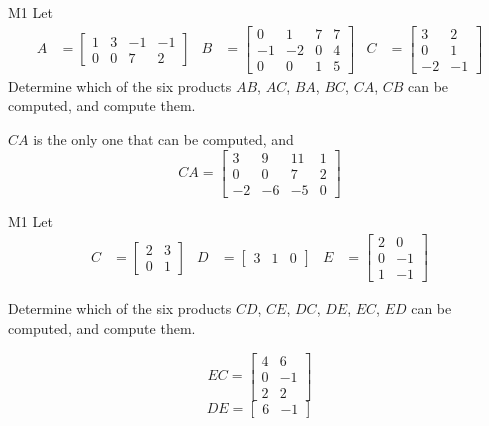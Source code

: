 \begin{problem}{M1}
Let 
\begin{align*}
A &= \begin{bmatrix} 1 & 3 & -1 & -1 \\ 0 & 0 & 7 & 2 \end{bmatrix} & B &= \begin{bmatrix} 0 & 1 & 7 & 7 \\ -1 & -2 & 0 & 4 \\ 0 & 0 & 1 & 5 \end{bmatrix} & C&=\begin{bmatrix} 3 & 2 \\ 0 & 1 \\ -2 & -1 \end{bmatrix}
\end{align*}
Determine which of the six products $AB$, $AC$, $BA$, $BC$, $CA$, $CB$ can be computed, and compute them.
\end{problem}
\begin{solution}
$CA$ is the only one that can be computed, and 
$$CA = \begin{bmatrix} 3 & 9 & 11 & 1 \\ 0 & 0 & 7 & 2 \\ -2 & - 6 & -5 & 0 \end{bmatrix}$$
\end{solution}


\begin{problem}{M1}
Let 
\begin{align*}
C &= \begin{bmatrix} 2 & 3 \\ 0 & 1 \end{bmatrix} & D&= \begin{bmatrix} 3 & 1 & 0 \end{bmatrix} & E&= \begin{bmatrix} 2 & 0 \\ 0 & -1 \\ 1 & -1 \end{bmatrix}
\end{align*}

Determine which of the six products $CD$, $CE$, $DC$, $DE$, $EC$, $ED$ can be computed, and compute them.
\end{problem}
\begin{solution}
$$EC=\begin{bmatrix} 4 & 6 \\ 0 & -1 \\ 2 & 2 \end{bmatrix}$$
$$DE = \begin{bmatrix} 6 & -1 \end{bmatrix}$$
\end{solution}


